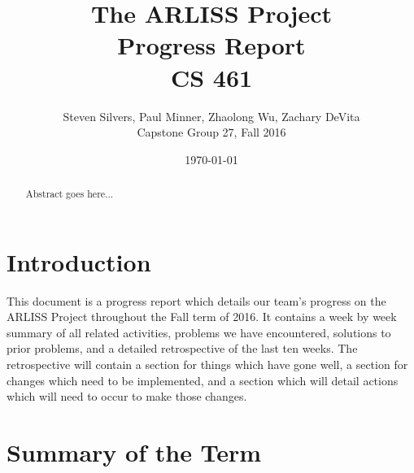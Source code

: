 \documentclass[10pt,letterpaper,onecolumn,draftclsnofoot,journal]{IEEEtran}
\begin{document}
\begin{titlepage}
	\title{The ARLISS Project\\Progress Report\\CS 461}
	\author{Steven Silvers, Paul Minner, Zhaolong Wu, Zachary DeVita\\
		Capstone Group 27, Fall 2016}
	\date{\today}
	\maketitle
	\vspace{4cm}
	\begin{abstract}
		\noindent Abstract goes here...
	\end{abstract}

\end{titlepage}
\tableofcontents
\clearpage

\section{Introduction}
This document is a progress report which details our team's progress on the ARLISS Project throughout the Fall term of 2016. It  contains a week by week summary of all related activities, problems we have encountered, solutions to prior problems, and a detailed retrospective of the last ten weeks. The retrospective will contain a section for things which have gone well, a section for changes which need to be implemented, and a section which will detail actions which will need to occur to make those changes.  

\section{Summary of the Term}
\end{document}
